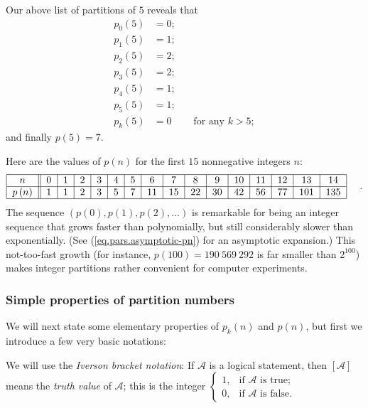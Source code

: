 \begin{example}
Our above list of partitions of $5$ reveals that%
\begin{align*}
p_{0}\left(  5\right)   &  =0;\\
p_{1}\left(  5\right)   &  =1;\\
p_{2}\left(  5\right)   &  =2;\\
p_{3}\left(  5\right)   &  =2;\\
p_{4}\left(  5\right)   &  =1;\\
p_{5}\left(  5\right)   &  =1;\\
p_{k}\left(  5\right)   &  =0\ \ \ \ \ \ \ \ \ \ \text{for any }k>5;
\end{align*}
and finally $p\left(  5\right)  =7$.
\end{example}

Here are the values of $p\left(  n\right)  $ for the first $15$ nonnegative
integers $n$:%
\[%
\begin{tabular}
[c]{|c||c|c|c|c|c|c|c|c|c|c|c|c|c|c|c|}\hline
$n$ & $0$ & $1$ & $2$ & $3$ & $4$ & $5$ & $6$ & $7$ & $8$ & $9$ & $10$ & $11$
& $12$ & $13$ & $14$\\\hline
$p\left(  n\right)  $ & $1$ & $1$ & $2$ & $3$ & $5$ & $7$ & $11$ & $15$ & $22$
& $30$ & $42$ & $56$ & $77$ & $101$ & $135$\\\hline
\end{tabular}
\ \ \ \ .
\]
The sequence $\left(  p\left(  0\right)  ,p\left(  1\right)  ,p\left(
2\right)  ,\ldots\right)  $ is remarkable for being an integer sequence that
grows faster than polynomially, but still considerably slower than
exponentially. (See (\ref{eq.pars.asymptotic-pn}) for an asymptotic
expansion.) This not-too-fast growth (for instance, $p\left(  100\right)
=190\ 569\ 292$ is far smaller than $2^{100}$) makes integer partitions rather
convenient for computer experiments.

\subsubsection{Simple properties of partition numbers}

We will next state some elementary properties of $p_{k}\left(  n\right)  $ and
$p\left(  n\right)  $, but first we introduce a few very basic notations:

\begin{definition}
\label{def.pars.iverson}We will use the \emph{Iverson bracket notation}: If
$\mathcal{A}$ is a logical statement, then $\left[  \mathcal{A}\right]  $
means the \emph{truth value} of $\mathcal{A}$; this is the integer $%
\begin{cases}
1, & \text{if }\mathcal{A}\text{ is true};\\
0, & \text{if }\mathcal{A}\text{ is false}.
\end{cases}
$
\end{definition}

